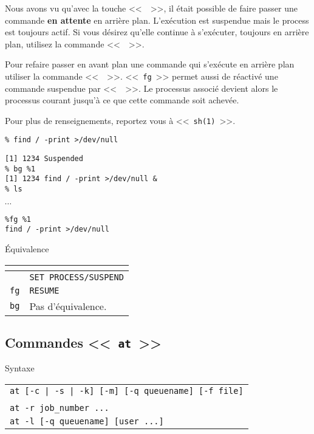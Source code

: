 Nous avons vu qu'avec la touche <<~~>>, il {\'e}tait possible de
faire passer une commande \textbf{en attente} en arri{\`e}re plan. {\large
L'ex{\'e}cution est suspendue mais le process est toujours actif}. Si vous
d{\'e}sirez qu'elle continue {\`a} s'ex{\'e}cuter, toujours en arri{\`e}re plan,
utilisez la commande <<~~>>.

Pour refaire passer en avant plan une commande qui s'ex{\'e}cute en arri{\`e}re
plan utiliser la commande <<~~>>. <<~\texttt{fg}~>>
permet aussi de r{\'e}activ{\'e} une commande suspendue par <<~~>>.
Le processus associ{\'e} devient alors le processus courant jusqu'{\`a} ce que
cette commande soit achev{\'e}e.

Pour plus de renseignements, reportez vous {\`a} <<~\texttt{sh(1)}~>>.

\begin{example}
\begin{verbatim}
% find / -print >/dev/null
\end{verbatim}
\begin{verbatim}
[1] 1234 Suspended
% bg %1
[1] 1234 find / -print >/dev/null &
% ls
\end{verbatim}
$\cdots$\\
\begin{verbatim}
%fg %1
find / -print >/dev/null
\end{verbatim}
\end{example}

\begin{definition}{\'{E}quivalence}
\begin{tabular}{|l|l|}
	\hline
		\multicolumn{1}{|c|}{{\Unix}}	&
		\multicolumn{1}{|c|}{{\OpenVMS}}	\\
	\hline \hline
		\control{Z}	&	{\tt SET PROCESS/SUSPEND}	\\
	\hline
		{\tt fg}		&	{\tt RESUME}				\\
	\hline
		{\tt bg}		&	Pas d'{\'e}quivalence.			\\
	\hline
\end{tabular}
\end{definition}

\subsection{Commandes <<~{\tt at}~>>}

\begin{definition}{Syntaxe}
\begin{tabular}{@{\hspace{0.5cm}}l}
	{\tt at [-c | -s | -k] [-m] [-q queuename] [-f file]} \\
	\hspace{1cm}{\tt date [increment] [command | file]}\\[0.2cm]
	{\tt at -r job\_number ...}\\[0.2cm]
	{\tt at -l [-q queuename] [user ...]}\\[0.2cm]
\end{tabular}
\end{definition}

